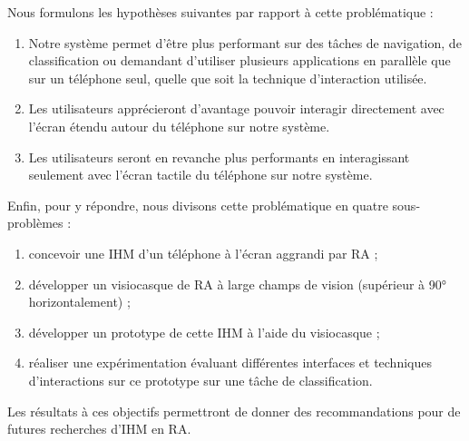 Nous formulons les hypothèses suivantes par rapport à cette problématique :
\begin{enumerate}
  \item Notre système	permet d'être plus performant sur des tâches de navigation, de classification ou demandant d'utiliser plusieurs applications en parallèle que sur un téléphone seul, quelle que soit la technique d'interaction utilisée.
  \item Les utilisateurs apprécieront d'avantage pouvoir interagir directement avec l'écran étendu autour du téléphone sur notre système.
  \item Les utilisateurs seront en revanche plus performants en interagissant seulement avec l'écran tactile du téléphone sur notre système.
\end{enumerate}

Enfin, pour y répondre, nous divisons cette problématique en quatre sous-problèmes :
\begin{enumerate}
  \item concevoir une IHM d'un téléphone à l'écran aggrandi par RA ;
  \item développer un visiocasque de RA à large champs de vision (supérieur à 90° horizontalement) ;
  \item développer un prototype de cette IHM à l'aide du visiocasque ;
  \item réaliser une expérimentation évaluant différentes interfaces et techniques d'interactions sur ce prototype sur une tâche de classification.
\end{enumerate}

Les résultats à ces objectifs permettront de donner des recommandations pour de futures recherches d'IHM en RA.